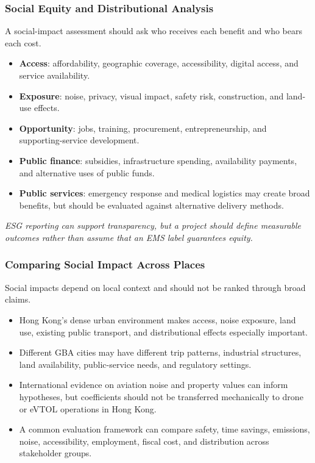 \documentclass{beamer}
\begin{document}
\begin{frame}[t]
\frametitle{Social Equity and Distributional Analysis}
A social-impact assessment should ask who receives each benefit and who bears each cost.
\begin{itemize}
\item \textbf{Access}: affordability, geographic coverage, accessibility, digital access, and service availability.
\item \textbf{Exposure}: noise, privacy, visual impact, safety risk, construction, and land-use effects.
\item \textbf{Opportunity}: jobs, training, procurement, entrepreneurship, and supporting-service development.
\item \textbf{Public finance}: subsidies, infrastructure spending, availability payments, and alternative uses of public funds.
\item \textbf{Public services}: emergency response and medical logistics may create broad benefits, but should be evaluated against alternative delivery methods.
\end{itemize}
\textit{ESG reporting can support transparency, but a project should define measurable outcomes rather than assume that an EMS label guarantees equity.}
\end{frame}

\begin{frame}[t]
\frametitle{Comparing Social Impact Across Places}
Social impacts depend on local context and should not be ranked through broad claims.
\begin{itemize}
\item Hong Kong's dense urban environment makes access, noise exposure, land use, existing public transport, and distributional effects especially important.
\item Different GBA cities may have different trip patterns, industrial structures, land availability, public-service needs, and regulatory settings.
\item International evidence on aviation noise and property values can inform hypotheses, but coefficients should not be transferred mechanically to drone or eVTOL operations in Hong Kong.
\item A common evaluation framework can compare safety, time savings, emissions, noise, accessibility, employment, fiscal cost, and distribution across stakeholder groups.
\end{itemize}
\end{frame}
\end{document}
